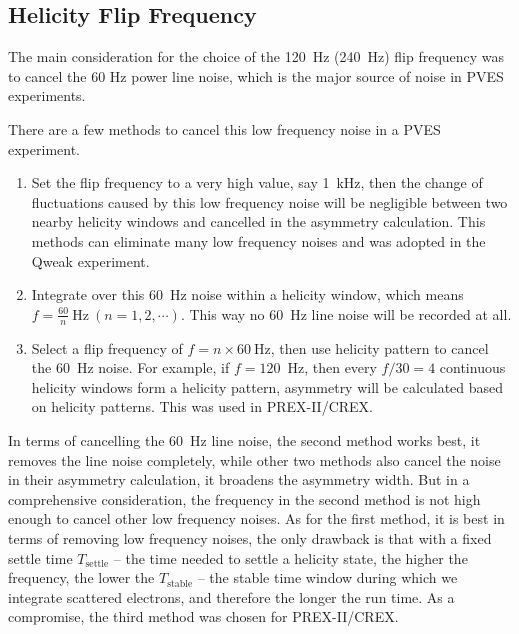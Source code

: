 \subsection{Helicity Flip Frequency}
The main consideration for the choice of the 120~Hz (240~Hz) flip frequency 
was to cancel the 60 Hz power line noise, which is the major source of noise
in PVES experiments. 

There are a few methods to cancel this low frequency noise in a PVES experiment.
\begin{enumerate}
    \item Set the flip frequency to a very high value, say 1~kHz, then
	the change of fluctuations caused by this low frequency noise will be negligible
	between two nearby helicity windows and cancelled in the asymmetry calculation. 
	This methods can eliminate many low frequency noises and was adopted in the Qweak experiment.
    \item Integrate over this 60~Hz noise within a helicity window, which means
	$f = \frac{60}{n}\ \mathrm{Hz}\ (n = 1, 2, \cdots)$. This way no 60~Hz line noise
	will be recorded at all.
    \item Select a flip frequency of $f = n \times 60 \ \mathrm{Hz}$,
	then use helicity pattern to cancel the 60~Hz noise. For example, 
	if $f = 120$~Hz, then every $f/30 = 4$ continuous helicity windows form a 
	helicity pattern, asymmetry will be calculated based on helicity patterns. 
	This was used in PREX-II/CREX.
\end{enumerate}

In terms of cancelling the 60~Hz line noise, the second method works best,
it removes the line noise completely, while other two methods also cancel the noise
in their asymmetry calculation, it broadens the asymmetry width. But in a comprehensive
consideration, the frequency in the second method is not high enough to cancel
other low frequency noises. As for the first method, it is best in terms of %
removing low frequency noises, the only drawback is that with a fixed settle time $T_{\text{settle}}$
-- the time needed to settle a helicity state,
the higher the frequency, the lower the $T_{\text{stable}}$ -- the stable time window
during which we integrate scattered electrons, and therefore the longer the run time. 
As a compromise, the third method was chosen for PREX-II/CREX.

